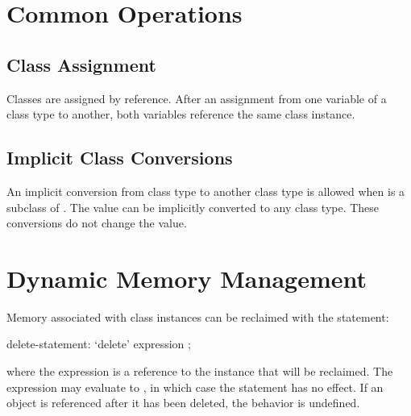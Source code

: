 \section{Common Operations}

\subsection{Class Assignment}
\label{Class_Assignment}

Classes are assigned by reference.  After an assignment from one
variable of a class type to another, both variables reference the same
class instance.

\subsection{Implicit Class Conversions}
\label{Implicit_Class_Conversions}

An implicit conversion from class type  to
another class type  is allowed when  is a subclass
of .
The value  can be implicitly converted to any class type.
These conversions do not change the value.


\section{Dynamic Memory Management}
\label{Dynamic_Memory_Management}
\label{Class_Delete}

Memory associated with class instances can be reclaimed with the 
statement:

\begin{syntax}
delete-statement:
  `delete' expression ;
\end{syntax}

where the expression is a reference to the instance that will be reclaimed.
The expression may evaluate to , in which case the 
statement has no effect.  If an object is referenced after it has
been deleted, the behavior is undefined.


